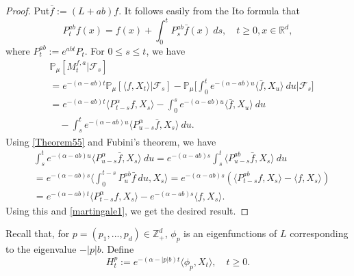 \documentclass[12pt,a4paper]{amsart}
\theoremstyle{plain}
\theoremstyle{definition}
\numberwithin{equation}{section}
\begin{document}
\begin{proof}
    Put$\bar{f}:=(L+ab)f$. 
    It follows easily from the Ito formula that
\begin{equation}\label{Theorem55}
    P_t^{ab}f(x)= f(x)+\int_0^t P_s^{ab}\bar{f}(x)~ds,\quad t\geq 0,x\in \mathbb R^d,
\end{equation}
    where $P_t^{ab} := e^{abt}P_t$.
    For $0\leq s\leq t$, we have
\begin{align}
\label{martingale1}
    &\mathbb{P}_{\mu}[M_t^{f,a}|\mathscr{F}_s]
    \\&=e^{-(\alpha-ab)t}\mathbb{P}_{\mu}\left[\langle f,X_t\rangle|\mathscr{F}_s\right]-\mathbb{P}_{\mu}\Big[\int_0^t e^{-(\alpha-ab)u}\langle \bar{f}, X_u\rangle~ du\Big|\mathscr{F}_s\big]
    \\&=e^{-(\alpha-ab)t}\langle P_{t-s}^{\alpha}f, X_s\rangle-\int_0^s e^{-(\alpha-ab)u}\langle \bar{f}, X_u\rangle~ du
    \\&\quad -\int_s^t e^{-(\alpha-ab)u}\langle P_{u-s}^{\alpha} \bar{f},X_s\rangle~ du.
\end{align}
    Using \eqref{Theorem55} and Fubini's theorem, we have
\begin{align}
    &\int_s^t e^{-(\alpha-ab)u}\langle P_{u-s}^{\alpha} \bar{f},X_s\rangle~ du=e^{-(\alpha-ab)s}\int_s^t\langle P_{u-s}^{ab}\bar{f},X_s\rangle~du\\
    &=e^{-(\alpha-ab)s}\Big\langle\int_0^{t-s}P_{u}^{ab}\bar{f}~du,X_s\Big\rangle=e^{-(\alpha-ab)s}\left(\langle P_{t-s}^{ab}f,X_s\rangle-\langle
    f,X_s\rangle\right)\\
    &=e^{-(\alpha-ab)t}\langle P_{t-s}^{\alpha}f, X_s\rangle-e^{-(\alpha-ab)s}\langle
    f,X_s\rangle.
\end{align}
    Using this and \eqref{martingale1}, we get the desired result.
\end{proof}

    Recall that, for $p=(p_1,...,p_d)\in \mathbb Z_+^d$,  $\phi_p$ is an eigenfunctions of $L$ corresponding to the eigenvalue $-|p|b$. Define
\[
    H_t^p
    :=e^{-(\alpha-|p|b)t}\langle\phi_p,X_t\rangle, \quad t\geq 0.
\]
\end{document}
